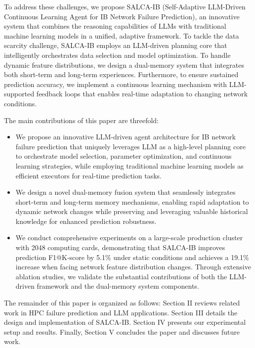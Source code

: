 \documentclass[conference]{IEEEtran}
\begin{document}
To address these challenges, we propose SALCA-IB (Self-Adaptive LLM-Driven Continuous Learning Agent for IB Network Failure Prediction), an innovative system that combines the reasoning capabilities of LLMs with traditional machine learning models in a unified, adaptive framework. To tackle the data scarcity challenge, SALCA-IB employs an LLM-driven planning core that intelligently orchestrates data selection and model optimization. To handle dynamic feature distributions, we design a dual-memory system that integrates both short-term and long-term experiences. Furthermore, to ensure sustained prediction accuracy, we implement a continuous learning mechanism with LLM-supported feedback loops that enables real-time adaptation to changing network conditions.

The main contributions of this paper are threefold:
\begin{itemize}
    \item We propose an innovative LLM-driven agent architecture for IB network failure prediction that uniquely leverages LLM as a high-level planning core to orchestrate model selection, parameter optimization, and continuous learning strategies, while employing traditional machine learning models as efficient executors for real-time prediction tasks.
    \item We design a novel dual-memory fusion system that seamlessly integrates short-term and long-term memory mechanisms, enabling rapid adaptation to dynamic network changes while preserving and leveraging valuable historical knowledge for enhanced prediction robustness.
    \item We conduct comprehensive experiments on a large-scale production cluster with 2048 computing cards, demonstrating that SALCA-IB improves prediction F1@K-score by 5.1\% under static conditions and achieves a 19.1\% increase when facing network feature distribution changes. Through extensive ablation studies, we validate the substantial contributions of both the LLM-driven framework and the dual-memory system components.
\end{itemize}

The remainder of this paper is organized as follows: Section II reviews related work in HPC failure prediction and LLM applications. Section III details the design and implementation of SALCA-IB. Section IV presents our experimental setup and results. Finally, Section V concludes the paper and discusses future work.
\end{document}
